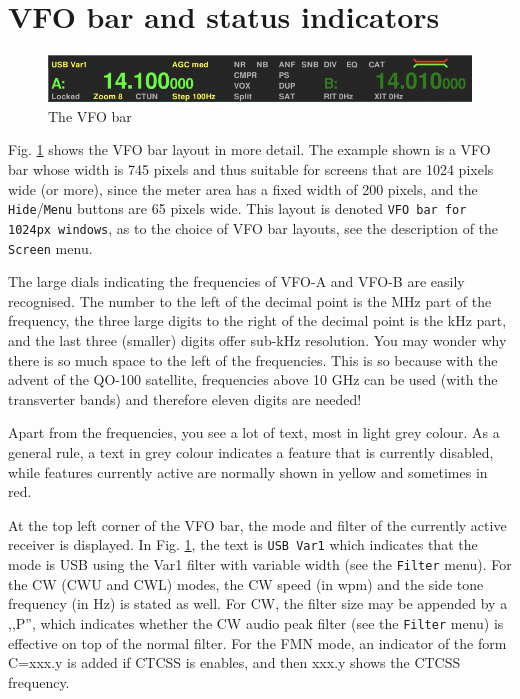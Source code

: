 \documentclass[12pt]{book}
\def\rett#1{\texttt{\color{red}#1}}
\def\bltt#1{\texttt{\color{blue}#1}}
\begin{document}
\section{VFO bar and status  indicators}
\label{sec:VFObar}
\begin{figure}[ht]
\center
\includegraphics[width=12cm]{VFObar.png}
\caption{The VFO bar}
\label{fig:VFObar}
\end{figure}

Fig. \ref{fig:VFObar} shows the VFO bar layout in more  detail.
The example shown is a VFO bar whose width is 745 pixels and
thus suitable for screens that are 1024 pixels wide (or more),
since the meter area has a fixed width of 200 pixels, and
the \rett{Hide}/\rett{Menu} buttons are 65 pixels wide. This layout is
denoted \texttt{VFO bar for 1024px windows}, as to the choice
of VFO bar layouts, see the description of the \bltt{Screen} menu.

The large dials indicating the frequencies of VFO-A and VFO-B
are easily recognised. The number to the left of the decimal
point is the MHz part of the frequency, the three  large digits
to the right  of  the decimal point is the kHz part, and
the last three (smaller) digits offer sub-kHz resolution.
You may wonder why there is  so much space to the left of
the frequencies. This is so because with the advent of
the QO-100 satellite, frequencies above 10 GHz can be
used (with the transverter bands) and therefore eleven
digits are needed!

Apart from the frequencies, you see a lot  of text, most in
light grey colour. As a general rule, a text  in grey
colour indicates a feature that is currently disabled,
while features currently active are normally shown in
yellow and sometimes in red.

At the top left  corner of the VFO bar, the mode and
filter of the currently active receiver is displayed.
In Fig. \ref{fig:VFObar}, the text is \rett{USB Var1}
which indicates that the  mode
is USB using the Var1 filter with variable width (see the \bltt{Filter} menu).
For the CW (CWU and CWL) modes, the CW speed (in wpm) and the side tone
frequency (in Hz) is stated as well. For CW, the filter size may be appended
by a ,,P'', which indicates whether the CW audio peak filter (see the
\bltt{Filter} menu) is effective on top of the normal filter.
For the FMN mode, an indicator of the form C=xxx.y is added if
CTCSS is enables, and then xxx.y shows the CTCSS frequency.
\end{document}
